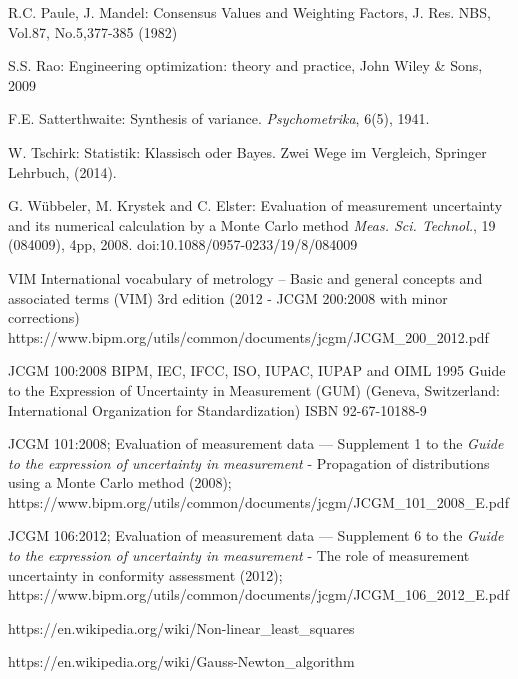 \documentclass[a4paper,11pt]{book}
\begin{document}
\begin{flushleft}
\begin{thebibliography}{------}
      R.C. Paule, J. Mandel: Consensus Values and Weighting Factors, J. Res. NBS, Vol.87, No.5,377-385 (1982)

     S.S. Rao: Engineering optimization: theory and practice,
    John Wiley \& Sons, 2009

     F.E. Satterthwaite: Synthesis of variance. {\em Psychometrika}, 6(5), 1941.

     W. Tschirk: Statistik: Klassisch oder Bayes. Zwei Wege im Vergleich, Springer Lehrbuch, (2014).

     G. Wübbeler, M. Krystek and C. Elster: Evaluation of measurement uncertainty
    and its numerical calculation by a Monte Carlo method
    {\em Meas. Sci. Technol.}, 19 (084009), 4pp, 2008.
    doi:10.1088/0957-0233/19/8/084009


     VIM International vocabulary of metrology – Basic and general
     concepts and associated terms (VIM) 3rd edition (2012 - JCGM 200:2008 with minor corrections)
     \newline https://www.bipm.org/utils/common/documents/jcgm/JCGM\_200\_2012.pdf

     JCGM 100:2008 BIPM, IEC, IFCC, ISO, IUPAC, IUPAP and OIML 1995 Guide to the Expression of Uncertainty in Measurement (GUM)
    (Geneva, Switzerland: International Organization for
    Standardization) ISBN 92-67-10188-9

    JCGM 101:2008; Evaluation of measurement data — Supplement 1 to the
    \textsl{Guide to the expression of uncertainty in measurement} -
    Propagation of distributions using a Monte Carlo method (2008); \newline
    https://www.bipm.org/utils/common/documents/jcgm/JCGM\_101\_2008\_E.pdf
    
    JCGM 106:2012; Evaluation of measurement data — Supplement 6 to the
    \textsl{Guide to the expression of uncertainty in measurement} -
    The role of measurement uncertainty in conformity assessment (2012); \newline
    https://www.bipm.org/utils/common/documents/jcgm/JCGM\_106\_2012\_E.pdf

     https://en.wikipedia.org/wiki/Non-linear\_least\_squares

     https://en.wikipedia.org/wiki/Gauss-Newton\_algorithm


\end{thebibliography}
\end{flushleft}
\end{document}
